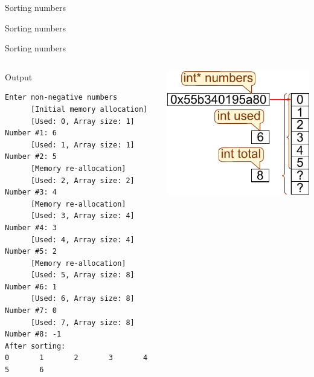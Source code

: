\documentclass[usenames,dvipsnames,aspectratio=169]{beamer}
\begin{document}
\begin{frame}{Sorting numbers}
  \begin{exampleblock}{}
    
  \end{exampleblock}
\end{frame}

\begin{frame}{Sorting numbers}
  \fontsize{8}{9} \selectfont
  \begin{exampleblock}{}
    \vspace{-.3cm}
    
    \vspace{-.3cm}
  \end{exampleblock}
\end{frame}

\begin{frame}[fragile]{Sorting numbers}
  \begin{columns}[T]
      \fontsize{7}{8} \selectfont
      \begin{block}{Output}
\begin{verbatim}
Enter non-negative numbers
      [Initial memory allocation]
      [Used: 0, Array size: 1]
Number #1: 6
      [Used: 1, Array size: 1]
Number #2: 5
      [Memory re-allocation]
      [Used: 2, Array size: 2]
Number #3: 4
      [Memory re-allocation]
      [Used: 3, Array size: 4]
Number #4: 3
      [Used: 4, Array size: 4]
Number #5: 2
      [Memory re-allocation]
      [Used: 5, Array size: 8]
Number #6: 1
      [Used: 6, Array size: 8]
Number #7: 0
      [Used: 7, Array size: 8]
Number #8: -1
After sorting:
0       1       2       3       4       5       6
\end{verbatim}
      \end{block}
    \begin{center}
      \includegraphics[width=\textwidth]{bubble7.pdf}
    \end{center}
  \end{columns}
\end{frame}
\end{document}
